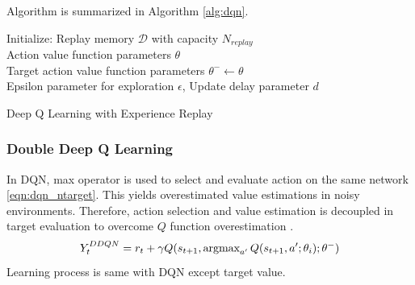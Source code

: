 Algorithm is summarized in Algorithm \ref{alg:dqn}. \\
\begin{algorithm}[H]
	\SetAlgoLined
	\DontPrintSemicolon %
	Initialize: Replay memory $\mathcal{D}$ with capacity $N_{replay}$ \\
	Action value function parameters $\theta$ \\
	Target action value function parameters $\theta^- \leftarrow \theta$ \\
	Epsilon parameter for exploration $\epsilon$, Update delay parameter $d$ \\
	\caption{Deep Q Learning with Experience Replay}
	\label{alg:dqn}
\end{algorithm}
\subsubsection{Double Deep Q Learning}
In DQN, max operator is used to select and evaluate action on the same network \ref{eqn:dqn_ntarget}. This yields overestimated value estimations in noisy environments. Therefore, action selection and value estimation is decoupled in target evaluation to overcome $Q$ function overestimation \cite{van_hasselt_deep_2015}. \\
\begin{equation}
\label{eqn:ddqn_ntarget}
Y_t^{DDQN} = r_t + \gamma Q(s_{t+1}, \operatorname{\textup{argmax}}_{a'} Q(s_{t+1}, a'; \theta_i );\theta^-)
\end{equation}
Learning process is same with DQN except target value. \\

